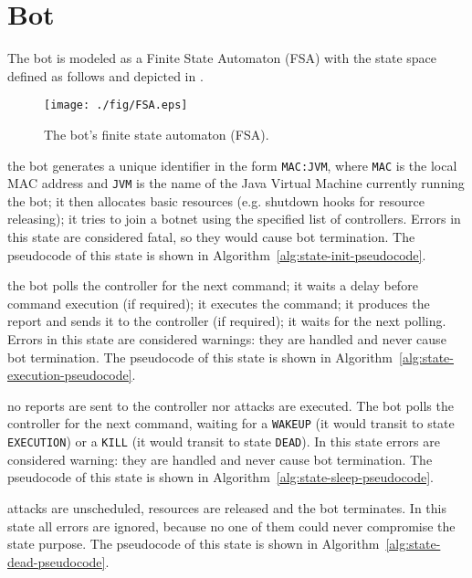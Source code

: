 \section{Bot}
\label{sec:bot}

The bot is modeled as a Finite State Automaton (FSA) with the state space defined as follows and depicted in .

\begin{figure}[tp]
  \centering
  \texttt{[image: ./fig/FSA.eps]}
  \caption{The bot's finite state automaton (FSA).}
    \label{fig:bot-fsa}
\end{figure}

\begin{description}
  \setlength\itemsep{1em}

  \item[INIT] the bot generates a unique identifier in the form \texttt{MAC:JVM}, where \texttt{MAC} is the local MAC address and \texttt{JVM} is the name of the Java Virtual Machine currently running the bot; it then allocates basic resources (e.g. shutdown hooks for resource releasing); it tries to join a botnet using the specified list of controllers.
  Errors in this state are considered fatal, so they would cause bot termination. The pseudocode of this state is shown in Algorithm~\ref{alg:state-init-pseudocode}.

  \item[EXECUTION] the bot polls the controller for the next command; it waits a delay before command execution (if required); it executes the command; it produces the report and sends it to the controller (if required); it waits for the next polling.
  Errors in this state are considered warnings: they are handled and never cause bot termination. The pseudocode of this state is shown in Algorithm~\ref{alg:state-execution-pseudocode}.

  \item[SLEEP] no reports are sent to the controller nor attacks are executed. The bot polls the controller for the next command, waiting for a \texttt{WAKEUP} (it would transit to state \texttt{EXECUTION}) or a \texttt{KILL} (it would transit to state \texttt{DEAD}).
  In this state errors are considered warning: they are handled and never cause bot termination. The pseudocode of this state is shown in Algorithm~\ref{alg:state-sleep-pseudocode}.

  \item[DEAD] attacks are unscheduled, resources are released and the bot terminates. In this state all errors are ignored, because no one of them could never compromise the state purpose. The pseudocode of this state is shown in Algorithm~\ref{alg:state-dead-pseudocode}.

\end{description}

